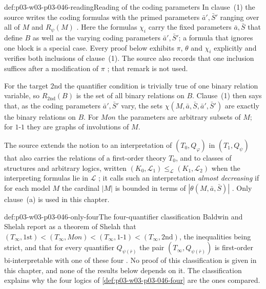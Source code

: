 \begin{hbconvention}{def:p03-w03-p03-046-reading}{Reading of the coding parameters}
In clause~(1) the source writes the coding formulas with the primed
parameters \(\bar a',\bar S'\) ranging over all of \(M\) and
\(R_\psi(M)\) \cite[p.~241]{BaldwinShelah1985}. Here the formulas
\(\chi_i\) carry the fixed parameters \(\bar a,\bar S\) that define \(B\)
as well as the varying coding parameters \(\bar a',\bar S'\); a formula
that ignores one block is a special case. Every proof below exhibits
\(\pi\), \(\theta\) and \(\chi_i\) explicitly and verifies both inclusions
of clause~(1). The source also records that one inclusion suffices after a
modification of \(\pi\) \cite[p.~242]{BaldwinShelah1985}; that remark is
not used.
\end{hbconvention}

For the target \(\mathrm{2nd}\) the quantifier condition is trivially true
of one binary relation variable, so \(R_{\mathrm{2nd}}(B)\) is the set of
all binary relations on \(B\). Clause~(1) then says that, as the coding
parameters \(\bar a',\bar S'\) vary, the sets
\(\chi(M,\bar a,\bar S,\bar a',\bar S')\) are exactly the binary relations on \(B\). For \(\mathit{Mon}\) the parameters
are arbitrary subsets of \(M\); for \(\text{1-1}\) they are graphs of
involutions of \(M\).

The source extends the notion to an interpretation of \((T_0,Q_\varphi)\)
in \((T_1,Q_\psi)\) that also carries the relations of a first-order theory
\(T_0\), and to classes of structures and arbitrary logics, written
\((K_0,\mathscr L_1)\le_{\mathscr L}(K_1,\mathscr L_2)\) when the
interpreting formulas lie in \(\mathscr L\)
\cite[p.~241, Definition~2.1.3(b), (d)]{BaldwinShelah1985}; it calls such
an interpretation \emph{almost decreasing} if for each model \(M\) the
cardinal \(|M|\) is bounded in terms of \(|\theta(M,\bar a,\bar S)|\)
\cite[p.~242, Definition~2.1.4]{BaldwinShelah1985}. Only clause~(a) is used
in this chapter.

\begin{proofboundary}{def:p03-w03-p03-046-only-four}{The four-quantifier classification}
Baldwin and Shelah report as a theorem of Shelah that
\((T_\infty,\mathrm{1st})<(T_\infty,\mathit{Mon})<(T_\infty,\text{1-1})<(T_\infty,\mathrm{2nd})\),
the inequalities being strict, and that for every quantifier
\(Q_{\psi(\bar r)}\) the pair \((T_\infty,Q_{\psi(\bar r)})\) is
first-order bi-interpretable with one of these four
\cite[p.~242, Theorem~2.1.6]{BaldwinShelah1985}. No proof of this
classification is given in this chapter, and none of the results below
depends on it. The classification explains why the four logics of
\cref{def:p03-w03-p03-046-four} are the ones compared.
\end{proofboundary}

